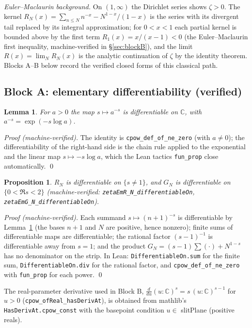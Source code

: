 \documentclass{article}
\newtheorem{lemma}[theorem]{Lemma}
\newtheorem{proposition}[theorem]{Proposition}
\newcommand{\C}{\mathbb{C}}
\newcommand{\zt}{\zeta}
\begin{document}
\emph{Euler--Maclaurin background.} On $(1,\infty)$ the Dirichlet series
shows $\zt>0$. The kernel $R_N(x)=\sum_{n\le N}n^{-x}-N^{1-x}/(1-x)$ is the
series with its divergent tail replaced by its integral approximation; for
$0<x<1$ each partial kernel is bounded above by the first term
$R_1(x)=x/(x-1)<0$ (the Euler--Maclaurin first inequality, machine-verified
in \S\ref{sec:blockB}), and the limit $R(x)=\lim_N R_N(x)$ is the analytic
continuation of $\zt$ by the identity theorem. Blocks A--B below record
the verified closed forms of this classical path.

\subsection{Block A: elementary differentiability (verified)}
\label{sec:blockA}

\begin{lemma}
\label{lem:cpowderiv}
For $a>0$ the map $s\mapsto a^{-s}$ is differentiable on $\C$, with
$a^{-s}=\exp(-s\log a)$.
\end{lemma}

\emph{Proof (machine-verified).} The identity is
\texttt{cpow\_def\_of\_ne\_zero} (with $a\neq 0$); the differentiability of
the right-hand side is the chain rule applied to the exponential and the
linear map $s\mapsto -s\log a$, which the Lean tactics \texttt{fun\_prop}
close automatically. \qed

\begin{proposition}
\label{prop:blockA}
$R_N$ is differentiable on $\{s\neq 1\}$, and $G_N$ is differentiable on
$\{0<\Re s<2\}$ (machine-verified:
\texttt{zetaEmR\_N\_differentiableOn}, \texttt{zetaEmG\_N\_differentiableOn}).
\end{proposition}

\emph{Proof (machine-verified).} Each summand $s\mapsto(n+1)^{-s}$ is
differentiable by Lemma~\ref{lem:cpowderiv} (the bases $n+1$ and $N$ are
positive, hence nonzero); finite sums of differentiable maps are
differentiable; the rational factor $(s-1)^{-1}$ is differentiable away
from $s=1$; and the product $G_N=(s-1)\sum(\cdot)+N^{1-s}$ has no
denominator on the strip. In Lean: \texttt{DifferentiableOn.sum} for the
finite sum, \texttt{DifferentiableOn.div} for the rational factor, and
\texttt{cpow\_def\_of\_ne\_zero} with \texttt{fun\_prop} for each power.
\qed

The real-parameter derivative used in Block B,
$\frac{d}{du}(u:\C)^s=s\,(u:\C)^{s-1}$ for $u>0$
(\texttt{cpow\_ofReal\_hasDerivAt}), is obtained from mathlib's
\texttt{HasDerivAt.cpow\_const} with the basepoint condition
$u\in$ slitPlane (positive reals).
\end{document}
